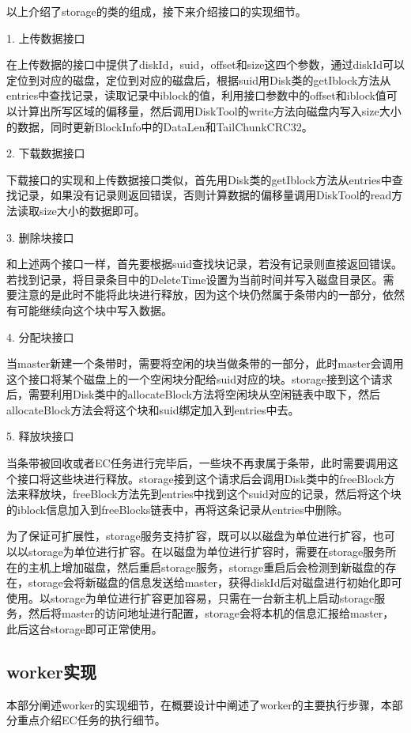 以上介绍了storage的类的组成，接下来介绍接口的实现细节。

1. 上传数据接口

在上传数据的接口中提供了diskId，suid，offset和size这四个参数，通过diskId可以定位到对应的磁盘，定位到对应的磁盘后，根据suid用Disk类的getIblock方法从entries中查找记录，读取记录中iblock的值，利用接口参数中的offset和iblock值可以计算出所写区域的偏移量，然后调用DiskTool的write方法向磁盘内写入size大小的数据，同时更新BlockInfo中的DataLen和TailChunkCRC32。

2. 下载数据接口

下载接口的实现和上传数据接口类似，首先用Disk类的getIblock方法从entries中查找记录，如果没有记录则返回错误，否则计算数据的偏移量调用DiskTool的read方法读取size大小的数据即可。

3. 删除块接口

和上述两个接口一样，首先要根据suid查找块记录，若没有记录则直接返回错误。若找到记录，将目录条目中的DeleteTime设置为当前时间并写入磁盘目录区。需要注意的是此时不能将此块进行释放，因为这个块仍然属于条带内的一部分，依然有可能继续向这个块中写入数据。

4. 分配块接口

当master新建一个条带时，需要将空闲的块当做条带的一部分，此时master会调用这个接口将某个磁盘上的一个空闲块分配给suid对应的块。storage接到这个请求后，需要利用Disk类中的allocateBlock方法将空闲块从空闲链表中取下，然后allocateBlock方法会将这个块和suid绑定加入到entries中去。

5. 释放块接口

当条带被回收或者EC任务进行完毕后，一些块不再隶属于条带，此时需要调用这个接口将这些块进行释放。storage接到这个请求后会调用Disk类中的freeBlock方法来释放块，freeBlock方法先到entries中找到这个suid对应的记录，然后将这个块的iblock信息加入到freeBlocks链表中，再将这条记录从entries中删除。

为了保证可扩展性，storage服务支持扩容，既可以以磁盘为单位进行扩容，也可以以storage为单位进行扩容。在以磁盘为单位进行扩容时，需要在storage服务所在的主机上增加磁盘，然后重启storage服务，storage重启后会检测到新磁盘的存在，storage会将新磁盘的信息发送给master，获得diskId后对磁盘进行初始化即可使用。以storage为单位进行扩容更加容易，只需在一台新主机上启动storage服务，然后将master的访问地址进行配置，storage会将本机的信息汇报给master，此后这台storage即可正常使用。

\subsection{worker实现}%
本部分阐述worker的实现细节，在概要设计中阐述了worker的主要执行步骤，本部分重点介绍EC任务的执行细节。

